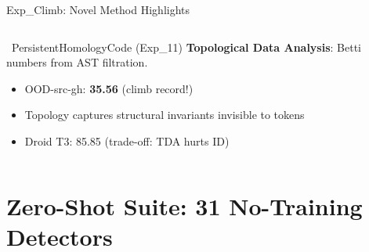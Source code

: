 \documentclass[aspectratio=169, 10pt]{beamer}
\begin{document}
\begin{frame}{Exp\_Climb: Novel Method Highlights}
\begin{columns}[T]
\begin{block}{\faStar\ PersistentHomologyCode (Exp\_11)}
\small
\textbf{Topological Data Analysis}: Betti numbers from AST filtration.\\[4pt]
\begin{itemize}\setlength\itemsep{2pt}
    \item OOD-src-gh: \textbf{35.56} (climb record!)
    \item Topology captures structural invariants invisible to tokens
    \item Droid T3: 85.85 (trade-off: TDA hurts ID)
\end{itemize}
\end{block}
\end{columns}
\end{frame}


\section{Zero-Shot Suite: 31 No-Training Detectors}
\end{document}
